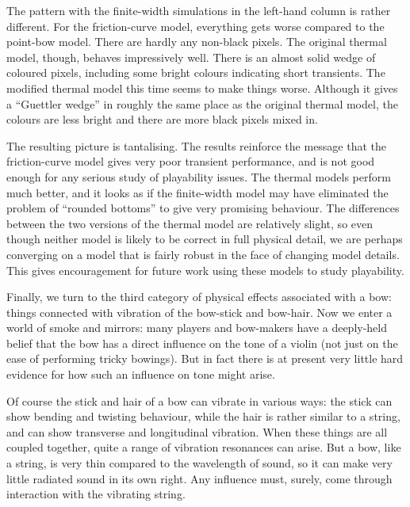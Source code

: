   The pattern with the finite-width simulations in the left-hand column is 
  rather different. For the friction-curve model, everything gets worse 
  compared to the point-bow model. There are hardly any non-black pixels. The 
  original thermal model, though, behaves impressively well. There is an almost 
  solid wedge of coloured pixels, including some bright colours indicating 
  short transients. The modified thermal model this time seems to make things 
  worse. Although it gives a “Guettler wedge” in roughly the same place as the 
  original thermal model, the colours are less bright and there are more black 
  pixels mixed in. 

  The resulting picture is tantalising. The results reinforce the message that 
  the friction-curve model gives very poor transient performance, and is not 
  good enough for any serious study of playability issues. The thermal models 
  perform much better, and it looks as if the finite-width model may have 
  eliminated the problem of “rounded bottoms” to give very promising behaviour. 
  The differences between the two versions of the thermal model are relatively 
  slight, so even though neither model is likely to be correct in full physical 
  detail, we are perhaps converging on a model that is fairly robust in the 
  face of changing model details. This gives encouragement for future work 
  using these models to study playability. 

  Finally, we turn to the third category of physical effects associated with a 
  bow: things connected with vibration of the bow-stick and bow-hair. Now we 
  enter a world of smoke and mirrors: many players and bow-makers have a 
  deeply-held belief that the bow has a direct influence on the tone of a 
  violin (not just on the ease of performing tricky bowings). But in fact there 
  is at present very little hard evidence for how such an influence on tone 
  might arise. 

  Of course the stick and hair of a bow can vibrate in various ways: the stick 
  can show bending and twisting behaviour, while the hair is rather similar to 
  a string, and can show transverse and longitudinal vibration. When these 
  things are all coupled together, quite a range of vibration resonances can 
  arise. But a bow, like a string, is very thin compared to the wavelength of 
  sound, so it can make very little radiated sound in its own right. Any 
  influence must, surely, come through interaction with the vibrating string. 

